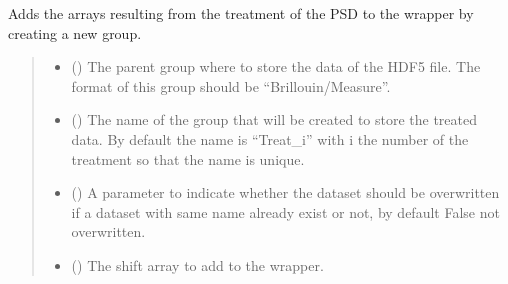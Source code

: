 \documentclass[letterpaper,10pt,english]{sphinxmanual}
\begin{document}
\begin{fulllineitems}
\begin{fulllineitems}
\label{\detokenize{source/_autosummary/HDF5_BLS.Wrapper:HDF5_BLS.Wrapper.add_treated_data}}
\pysigstartsignatures
\pysiglinewithargsret
{}
{\sphinxparamcomma {}\sphinxparamcomma {}\sphinxparamcomma {}}
{}
\pysigstopsignatures
\sphinxAtStartPar
Adds the arrays resulting from the treatment of the PSD to the wrapper by creating a new group.
\begin{quote}\begin{description}
\begin{itemize}
\item {} 
\sphinxAtStartPar
{} (\sphinxstyleliteralemphasis{\sphinxupquote{, }}) \textendash{} The parent group where to store the data of the HDF5 file. The format of this group should be “Brillouin/Measure”.

\item {} 
\sphinxAtStartPar
{} (\sphinxstyleliteralemphasis{\sphinxupquote{, }}) \textendash{} The name of the group that will be created to store the treated data. By default the name is “Treat\_i” with i the number of the treatment so that the name is unique.

\item {} 
\sphinxAtStartPar
{} (\sphinxstyleliteralemphasis{\sphinxupquote{, }}) \textendash{} A parameter to indicate whether the dataset should be overwritten if a dataset with same name already exist or not, by default False \sphinxhyphen{} not overwritten.

\item {} 
\sphinxAtStartPar
{} (\sphinxstyleliteralemphasis{\sphinxupquote{, }}) \textendash{} The shift array to add to the wrapper.


\end{itemize}
\end{description}
\end{quote}
\end{fulllineitems}
\end{fulllineitems}
\end{document}
